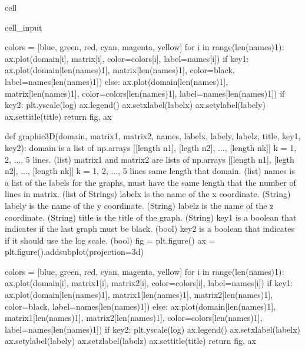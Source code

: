 \documentclass[letterpaper,10pt,english]{jupyterBook}
\begin{document}
\begin{sphinxuseclass}{cell}
\begin{sphinxVerbatimInput}
\begin{sphinxuseclass}{cell_input}
\begin{sphinxVerbatim}[commandchars=\\\{\}]
  colors = [\PYGZsq{}blue\PYGZsq{}, \PYGZsq{}green\PYGZsq{}, \PYGZsq{}red\PYGZsq{}, \PYGZsq{}cyan\PYGZsq{}, \PYGZsq{}magenta\PYGZsq{}, \PYGZsq{}yellow\PYGZsq{}]
  for i in range(len(names)\PYGZhy{}1):
    ax.plot(domain[i], matrix[i], color=colors[i], label=names[i])
  if key1:
    ax.plot(domain[len(names)\PYGZhy{}1], matrix[len(names)\PYGZhy{}1], color=\PYGZsq{}black\PYGZsq{}, label=names[len(names)\PYGZhy{}1])
  else:
    ax.plot(domain[len(names)\PYGZhy{}1], matrix[len(names)\PYGZhy{}1], color=colors[len(names)\PYGZhy{}1], label=names[len(names)\PYGZhy{}1])
  if key2:
    plt.yscale(\PYGZsq{}log\PYGZsq{})
  ax.legend()
  ax.set\PYGZus{}xlabel(labelx)
  ax.set\PYGZus{}ylabel(labely)
  ax.set\PYGZus{}title(title)
  return fig, ax

def graphic\PYGZus{}3D(domain, matrix1, matrix2, names, labelx, labely, labelz, title, key1, key2):
  \PYGZsq{}\PYGZsq{}\PYGZsq{}
  domain is a list of np.arrays [[length n1], [legth n2], ..., [length nk]]
  k = 1, 2, ..., 5 lines. (list)
  matrix1 and matrix2 are lists of np.arrays [[length n1], [legth n2], ..., [length nk]]
  k = 1, 2, ..., 5 lines \PYGZhy{} same length that domain. (list)
  names is a list of the labels for the graphs, must have the same length that
  the number of lines in matrix. (list of Strings)
  labelx is the name of the x coordinate. (String)
  labely is the name of the y coordinate. (String)
  labelz is the name of the z coordinate. (String)
  title is the title of the graph. (String)
  key1 is a boolean that indicates if the last graph must be black. (bool)
  key2 is a boolean that indicates if it should use the log scale. (bool)
  \PYGZsq{}\PYGZsq{}\PYGZsq{}
  fig = plt.figure()
  ax = plt.figure().add\PYGZus{}subplot(projection=\PYGZsq{}3d\PYGZsq{})

  colors = [\PYGZsq{}blue\PYGZsq{}, \PYGZsq{}green\PYGZsq{}, \PYGZsq{}red\PYGZsq{}, \PYGZsq{}cyan\PYGZsq{}, \PYGZsq{}magenta\PYGZsq{}, \PYGZsq{}yellow\PYGZsq{}]
  for i in range(len(names)\PYGZhy{}1):
    ax.plot(domain[i], matrix1[i], matrix2[i], color=colors[i], label=names[i])
  if key1:
    ax.plot(domain[len(names)\PYGZhy{}1], matrix1[len(names)\PYGZhy{}1], matrix2[len(names)\PYGZhy{}1], color=\PYGZsq{}black\PYGZsq{}, label=names[len(names)\PYGZhy{}1])
  else:
    ax.plot(domain[len(names)\PYGZhy{}1], matrix1[len(names)\PYGZhy{}1], matrix2[len(names)\PYGZhy{}1], color=colors[len(names)\PYGZhy{}1], label=names[len(names)\PYGZhy{}1])
  if key2:
    plt.yscale(\PYGZsq{}log\PYGZsq{})
  ax.legend()
  ax.set\PYGZus{}xlabel(labelx)
  ax.set\PYGZus{}ylabel(labely)
  ax.set\PYGZus{}zlabel(labelz)
  ax.set\PYGZus{}title(title)
  return fig, ax


\end{sphinxVerbatim}
\end{sphinxuseclass}
\end{sphinxVerbatimInput}
\end{sphinxuseclass}
\end{document}
